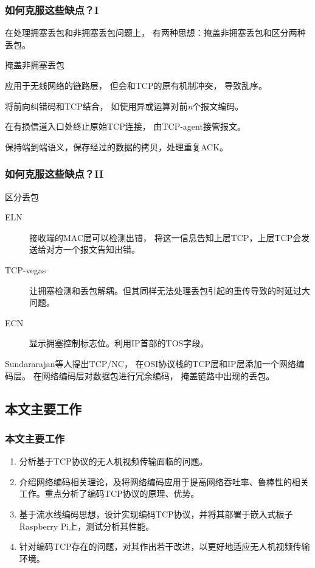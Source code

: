 \begin{frame}
	\frametitle{如何克服这些缺点？I}
	在处理拥塞丢包和非拥塞丢包问题上，
	有两种思想：掩盖非拥塞丢包和区分两种丢包。
	\begin{block}{掩盖非拥塞丢包}
		\begin{description}
			\footnotesize
			\item[ARQ] 应用于无线网络的链路层，
			但会和TCP的原有机制冲突，
			导致乱序。
			\item[FEC] 将前向纠错码和TCP结合，
			如使用异或运算对前\emph{n}个报文编码。
			\item[Indirect-TCP\footfullcite{Bakre1995I}] 在有损信道入口处终止原始TCP连接，
			由TCP-agent接管报文。
			\item[TCP-snoop\footfullcite{Balakrishnan1995Improving}] 保持端到端语义，保存经过的数据的拷贝，处理重复ACK。
		\end{description}
	\end{block}
\end{frame}

\begin{frame}
	\frametitle{如何克服这些缺点？II}
	\begin{block}{区分丢包}
		\footnotesize
		\begin{description}
			\item[ELN] 接收端的MAC层可以检测出错，
			将这一信息告知上层TCP，上层TCP会发送给对方一个报文告知出错。
			\item[TCP-vegas] 让拥塞检测和丢包解耦。但其同样无法处理丢包引起的重传导致的时延过大问题。
			\item[ECN] 显示拥塞控制标志位。利用IP首部的TOS字段。
		\end{description}
	\end{block}
	Sundararajan等人提出TCP/NC，
	在OSI协议栈的TCP层和IP层添加一个网络编码层。
	在网络编码层对数据包进行冗余编码，
	掩盖链路中出现的丢包。
\end{frame}

\subsection{本文主要工作}
\begin{frame}
	\frametitle{本文主要工作}
	\begin{enumerate}
		\item 分析基于TCP协议的无人机视频传输面临的问题。
		\item 介绍网络编码相关理论，及将网络编码应用于提高网络吞吐率、鲁棒性的相关工作。重点分析了编码TCP协议的原理、优势。
		\item 基于流水线编码思想，设计实现编码TCP协议，并将其部署于嵌入式板子Raspberry Pi上，测试分析其性能。
		\item 针对编码TCP存在的问题，对其作出若干改进，以更好地适应无人机视频传输环境。
	\end{enumerate}
\end{frame}